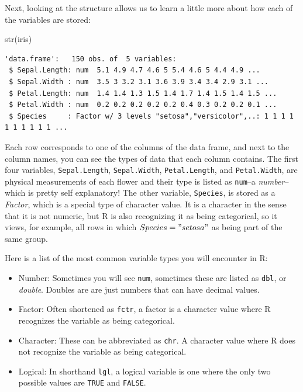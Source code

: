\documentclass[
  letterpaper,
]{book}
\newenvironment{Shaded}{\begin{snugshade}}{\end{snugshade}}
\newcommand{\FunctionTok}[1]{\textcolor[rgb]{0.28,0.35,0.67}{#1}}
\newcommand{\NormalTok}[1]{\textcolor[rgb]{0.00,0.23,0.31}{#1}}
\providecommand{\tightlist}{%
  \setlength{\itemsep}{0pt}\setlength{\parskip}{0pt}}\usepackage{longtable,booktabs,array}
\begin{document}
Next, looking at the structure allows us to learn a little more about
how each of the variables are stored:

\begin{Shaded}
\begin{Highlighting}[]
\FunctionTok{str}\NormalTok{(iris)}
\end{Highlighting}
\end{Shaded}

\begin{verbatim}
'data.frame':   150 obs. of  5 variables:
 $ Sepal.Length: num  5.1 4.9 4.7 4.6 5 5.4 4.6 5 4.4 4.9 ...
 $ Sepal.Width : num  3.5 3 3.2 3.1 3.6 3.9 3.4 3.4 2.9 3.1 ...
 $ Petal.Length: num  1.4 1.4 1.3 1.5 1.4 1.7 1.4 1.5 1.4 1.5 ...
 $ Petal.Width : num  0.2 0.2 0.2 0.2 0.2 0.4 0.3 0.2 0.2 0.1 ...
 $ Species     : Factor w/ 3 levels "setosa","versicolor",..: 1 1 1 1 1 1 1 1 1 1 ...
\end{verbatim}

Each row corresponds to one of the columns of the data frame, and next
to the column names, you can see the types of data that each column
contains. The first four variables, \texttt{Sepal.Length},
\texttt{Sepal.Width}, \texttt{Petal.Length}, and \texttt{Petal.Width},
are physical measurements of each flower and their type is listed as
\texttt{num}--a \emph{number}--which is pretty self explanatory! The
other variable, \texttt{Species}, is stored as a \emph{Factor}, which is
a special type of character value. It is a character in the sense that
it is not numeric, but R is also recognizing it as being categorical, so
it views, for example, all rows in which \(Species = "setosa"\) as being
part of the same group.

Here is a list of the most common variable types you will encounter in
R:

\begin{itemize}
\tightlist
\item
  Number: Sometimes you will see \texttt{num}, sometimes these are
  listed as \texttt{dbl}, or \emph{double}. Doubles are are just numbers
  that can have decimal values.
\item
  Factor: Often shortened as \texttt{fctr}, a factor is a character
  value where R recognizes the variable as being categorical.
\item
  Character: These can be abbreviated as \texttt{chr}. A character value
  where R does not recognize the variable as being categorical.
\item
  Logical: In shorthand \texttt{lgl}, a logical variable is one where
  the only two possible values are \texttt{TRUE} and \texttt{FALSE}.
\end{itemize}
\end{document}
